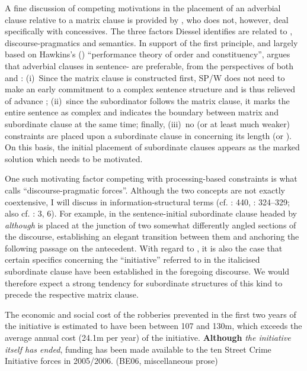 A fine discussion of competing motivations in the placement of an adverbial clause relative to a matrix clause is provided by \citet{Diessel2005}, who does not, however, deal specifically with concessives. The three factors Diessel identifies are related to , discourse-pragmatics and semantics. In support of the first principle, and largely based on Hawkins’s (\citeyear{Hawkins1990, Hawkins1992, Hawkins1994, Hawkins2000}) “performance theory of order and constituency”, \citet[458–459]{Diessel2005} argues that adverbial clauses in sentence- are preferable, from the perspectives of both  and :
(i)~Since the matrix clause is constructed first, SP/W does not need to make an early commitment to a complex sentence structure and is thus relieved of advance ;
(ii)~since the subordinator follows the matrix clause, it marks the entire sentence as complex and indicates the boundary between matrix and subordinate clause at the same time; finally,
(iii)~no (or at least much weaker) constraints are placed upon a subordinate clause in  concerning its length (or ). On this basis, the initial placement of subordinate clauses appears as the marked solution which needs to be motivated.

One such motivating factor competing with processing-based constraints is what \citet[459–461]{Diessel2005} calls “discourse-pragmatic forces”. Although the two concepts are not exactly coextensive, I will discuss  in information-structural terms (cf. \citealt{Chafe1976,Chafe1984}: 440, \citealt{Lambrecht1994,Krifka2008,BrintonBrinton2010}: 324–329; also cf. \citealt{WiechmannKerz2013}: 3, 6). For example, in  the sentence-initial subordinate clause headed by \textit{although} is placed at the junction of two somewhat differently angled sections of the discourse, establishing an elegant transition between them and anchoring the following passage on the antecedent. With regard to , it is also the case that certain specifics concerning the “initiative” referred to in the italicised subordinate clause have been established in the foregoing discourse. We would therefore expect a strong tendency for subordinate structures of this kind to precede the respective matrix clause.

\ea\label{ex:29}   \label{bkm:Ref469857390}The economic and social cost of the robberies prevented in the first two years of the initiative is estimated to have been between 107 and 130m, which exceeds the average annual cost (24.1m per year) of the initiative. \textbf{Although} \textit{the initiative itself has ended}, funding has been made available to the ten Street Crime Initiative forces in 2005/2006. (BE06, miscellaneous prose)\\
\z

